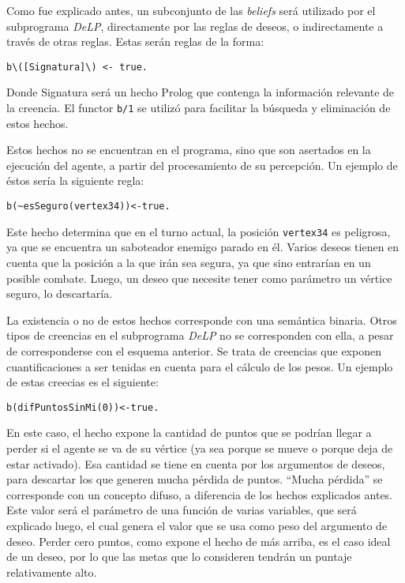 \documentclass[oneside]{book}
\begin{document}
\label{sec:creencias}

Como fue explicado antes, %
un subconjunto de las  \textit{beliefs} será utilizado por el subprograma 
\textit{DeLP}, directamente por 
las reglas de deseos, o indirectamente a través de otras reglas. Estas serán reglas de 
la forma:

\begin{verbatim}
b\([Signatura]\) <- true.
\end{verbatim}

Donde Signatura será un hecho Prolog que contenga la información relevante de la 
creencia. El functor \texttt{b/1} se utilizó para facilitar la búsqueda y 
eliminación de estos hechos. 

Estos hechos no se encuentran en el programa, sino que son asertados en la ejecución
del agente, a partir del procesamiento de su percepción. 
Un ejemplo de éstos sería la siguiente regla:

\begin{verbatim}
b(~esSeguro(vertex34))<-true.
\end{verbatim}

Este hecho determina que en el turno actual, la posición \texttt{vertex34} es peligrosa,
ya que se encuentra un saboteador enemigo parado en él. Varios deseos tienen en cuenta
que la posición a la que irán sea segura, ya que sino entrarían en un posible combate.
Luego, un deseo que necesite tener como parámetro un vértice seguro, lo descartaría.

La existencia o no de estos hechos corresponde con una semántica binaria. Otros tipos de
creencias en el subprograma \textit{DeLP} no se corresponden con ella, a pesar de corresponderse
con el esquema anterior. Se trata de creencias que exponen cuantificaciones a ser 
tenidas en cuenta para el cálculo de los pesos. Un ejemplo de estas creecias es el 
siguiente:

\begin{verbatim}
b(difPuntosSinMi(0))<-true.
\end{verbatim}

En este caso, el hecho expone la cantidad de puntos que se podrían llegar a perder si el
agente se va de su vértice (ya sea porque se mueve o porque deja de estar activado). Esa
cantidad se tiene en cuenta por los argumentos de deseos, para descartar los que generen
mucha pérdida de puntos. ``Mucha pérdida'' se corresponde con un concepto difuso, a
diferencia de los hechos explicados antes. Este valor será el parámetro de una función
de varias variables, que será explicado luego, el cual genera el valor que se usa como
peso del argumento de deseo. Perder cero puntos, como expone el hecho de más arriba, es el
caso ideal de un deseo, por lo que las metas que lo consideren tendrán un puntaje
relativamente alto.
\end{document}
